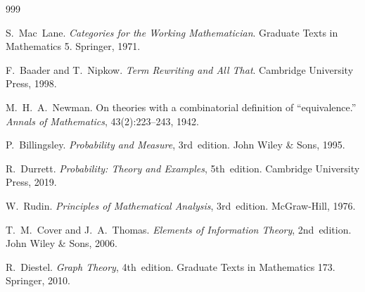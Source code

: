 
\begin{thebibliography}{999}


S.~Mac~Lane.
\newblock \emph{Categories for the Working Mathematician}.
\newblock Graduate Texts in Mathematics 5. Springer, 1971.


F.~Baader and T.~Nipkow.
\newblock \emph{Term Rewriting and All That}.
\newblock Cambridge University Press, 1998.

M.~H.~A.~Newman.
\newblock On theories with a combinatorial definition of ``equivalence.''
\newblock \emph{Annals of Mathematics}, 43(2):223--243, 1942.


P.~Billingsley.
\newblock \emph{Probability and Measure}, 3rd~edition.
\newblock John Wiley \& Sons, 1995.

R.~Durrett.
\newblock \emph{Probability: Theory and Examples}, 5th~edition.
\newblock Cambridge University Press, 2019.


W.~Rudin.
\newblock \emph{Principles of Mathematical Analysis}, 3rd~edition.
\newblock McGraw-Hill, 1976.

T.~M.~Cover and J.~A.~Thomas.
\newblock \emph{Elements of Information Theory}, 2nd~edition.
\newblock John Wiley \& Sons, 2006.


R.~Diestel.
\newblock \emph{Graph Theory}, 4th~edition.
\newblock Graduate Texts in Mathematics 173. Springer, 2010.


\end{thebibliography}
